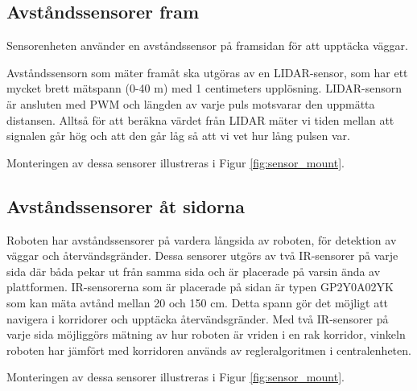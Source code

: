 \documentclass[a4paper,titlepage,12pt]{article}
\begin{document}
    \subsection{Avståndssensorer fram}
        Sensorenheten använder en avståndssensor på framsidan för att upptäcka väggar.

        Avståndssensorn som mäter framåt ska utgöras av en LIDAR-sensor, som har
	    ett mycket brett mätspann (0-40 m) med 1 centimeters upplösning. LIDAR-sensorn
	    är ansluten med PWM och längden av varje puls motsvarar den uppmätta distansen.
	    Alltså för att beräkna värdet från LIDAR mäter vi tiden	mellan att signalen går
	    hög och att den går låg så att vi vet hur lång pulsen var.

	    Monteringen av dessa sensorer illustreras i Figur \ref{fig:sensor_mount}.

        \subsection{Avståndssensorer åt sidorna}
        Roboten har avståndssensorer på vardera långsida av roboten, för
        detektion av väggar och återvändsgränder. Dessa sensorer utgörs av två
        IR-sensorer på varje sida där båda pekar ut från samma sida och
        är placerade på varsin ända av plattformen. IR-sensorerna som är placerade
        på sidan är typen GP2Y0A02YK som kan mäta avtånd mellan 20 och 150 cm.
        Detta spann gör det möjligt att navigera i korridorer och upptäcka
        återvändsgränder. Med två IR-sensorer på varje sida möjliggörs mätning av hur
        roboten är vriden i en rak korridor, vinkeln roboten har jämfört med
        korridoren används av regleralgoritmen i centralenheten.

	    Monteringen av dessa sensorer illustreras i Figur \ref{fig:sensor_mount}.
\end{document}

